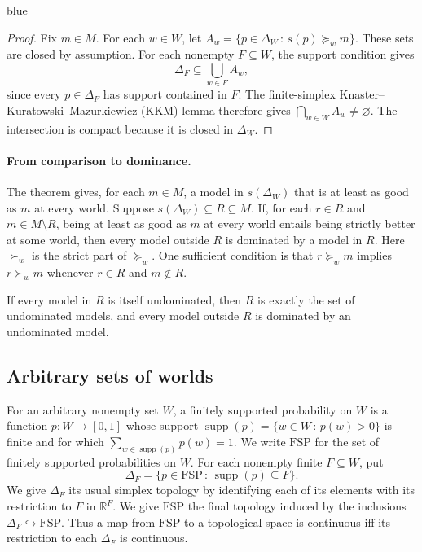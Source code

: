 \documentclass[11pt]{article}
\theoremstyle{definition}
\theoremstyle{remark}
\newcommand{\R}{\mathbb R}
\newcommand{\supp}{\operatorname{supp}}
\newcommand{\given}{\,:\,}
\newcommand{\FSP}{\mathrm{FSP}}
\newenvironment{AIwritten}{\begin{color}{blue}}{\end{color}}
\begin{document}
\begin{AIwritten}
	\begin{proof}
		Fix $m\in M$. For each $w\in W$, let
		$A_w=\{p\in\Delta_W\given s(p)\succeq_w m\}$.
		These sets are closed by assumption. For each nonempty
		$F\subseteq W$, the support condition gives
		\[
		\Delta_F\subseteq\bigcup_{w\in F}A_w,
		\]
		since every $p\in\Delta_F$ has support contained in $F$.
		The finite-simplex Knaster--Kuratowski--Mazurkiewicz (KKM)
		lemma therefore gives $\bigcap_{w\in W}A_w\neq\varnothing$.
		The intersection is compact because it is closed in $\Delta_W$.
	\end{proof}
	
	\paragraph{From comparison to dominance.}
	The theorem gives, for each $m\in M$, a model in $s(\Delta_W)$
	that is at least as good as $m$ at every world. Suppose
	$s(\Delta_W)\subseteq R\subseteq M$. If, for each $r\in R$ and
	$m\in M\setminus R$, being at least as good as $m$ at every world
	entails being strictly better at some world, then every model
	outside $R$ is dominated by a model in $R$. Here $\succ_w$ is the
	strict part of $\succeq_w$. One sufficient condition is that
	$r\succeq_w m$ implies $r\succ_w m$ whenever $r\in R$ and
	$m\notin R$.
	
	If every model in $R$ is itself undominated, then $R$ is exactly
	the set of undominated models, and every model outside $R$ is
	dominated by an undominated model.
	
	\subsection{Arbitrary sets of worlds}
	
	For an arbitrary nonempty set $W$, a finitely supported probability
	on $W$ is a function $p\colon W\to[0,1]$ whose support
	$\supp(p)=\{w\in W\given p(w)>0\}$ is finite and for which
	$\sum_{w\in\supp(p)}p(w)=1$. We write $\FSP$ for the set of
	finitely supported probabilities on $W$. For each nonempty finite
	$F\subseteq W$, put
	\[
	\Delta_F=\{p\in\FSP\given \supp(p)\subseteq F\}.
	\]
	We give $\Delta_F$ its usual simplex topology by identifying each
	of its elements with its restriction to $F$ in $\R^F$. We give
	$\FSP$ the final topology induced by the inclusions
	$\Delta_F\hookrightarrow\FSP$. Thus a map from $\FSP$ to a
	topological space is continuous iff its restriction to each
	$\Delta_F$ is continuous.
	

\end{AIwritten}
\end{document}
